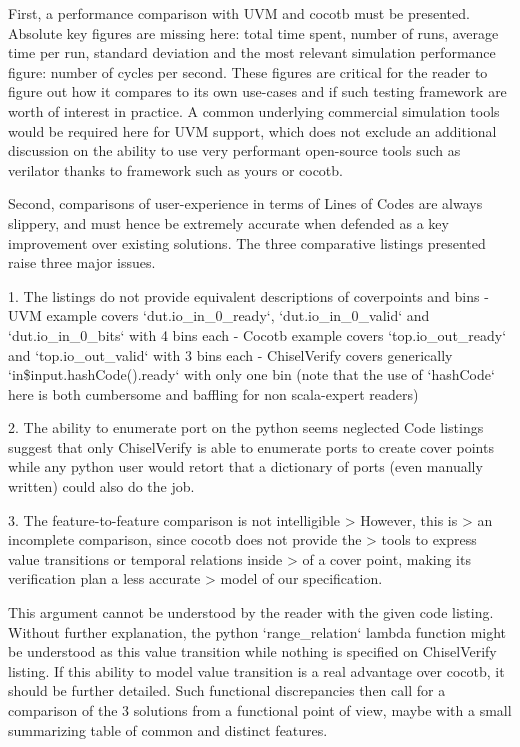 \documentclass{article}
\begin{document}
First, a performance comparison with UVM and cocotb must be presented.
Absolute key figures are missing here: total time spent, number of runs, average time per run, standard deviation and the most relevant simulation performance figure: number of cycles per second.
These figures are critical for the reader to figure out how it compares to its own use-cases and if such testing framework are worth of interest in practice.
A common underlying commercial simulation tools would be required here for UVM support, which does not exclude an additional discussion on the ability to use very performant open-source tools such as verilator thanks to framework such as yours or cocotb.

Second, comparisons of user-experience in terms of Lines of Codes are always slippery, and must hence be extremely accurate when defended as a key improvement over existing solutions.
The three comparative listings presented raise three major issues.

1. The listings do not provide equivalent descriptions of coverpoints and bins
- UVM example covers `dut.io\_in\_0\_ready`, `dut.io\_in\_0\_valid` and `dut.io\_in\_0\_bits` with 4 bins each
- Cocotb example covers `top.io\_out\_ready` and `top.io\_out\_valid` with 3 bins each
- ChiselVerify covers generically `in\${input.hashCode()}.ready` with only one bin (note that the use of `hashCode` here is both cumbersome and baffling for non scala-expert readers)

2. The ability to enumerate port on the python seems neglected
Code listings suggest that only ChiselVerify is able to enumerate ports to create cover points while any python user would retort that a dictionary of ports (even manually written) could also do the job. 

3. The feature-to-feature comparison is not intelligible 
> However, this is
> an incomplete comparison, since cocotb does not provide the
> tools to express value transitions or temporal relations inside
> of a cover point, making its verification plan a less accurate
> model of our specification. 

This argument cannot be understood by the reader with the given code listing.
Without further explanation, the python `range\_relation` lambda function might be understood as this value transition while nothing is specified on ChiselVerify listing.
If this ability to model value transition is a real advantage over cocotb, it should be further detailed.
Such functional discrepancies then call for a comparison of the 3 solutions from a functional point of view, maybe with a small summarizing table of common and distinct features.
\end{document}
